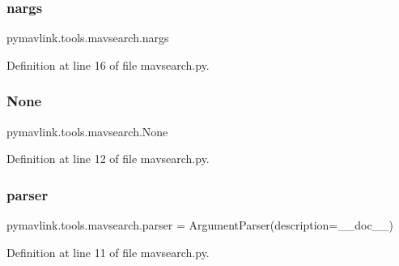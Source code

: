 \subsubsection{\texorpdfstring{nargs}{nargs}}
{\footnotesize\ttfamily pymavlink.\+tools.\+mavsearch.\+nargs}



Definition at line 16 of file mavsearch.\+py.

\mbox{\label{namespacepymavlink_1_1tools_1_1mavsearch_aa34c8e0d633cb457ef12fb58dc73fbd5}} 
\subsubsection{\texorpdfstring{None}{None}}
{\footnotesize\ttfamily pymavlink.\+tools.\+mavsearch.\+None}



Definition at line 12 of file mavsearch.\+py.

\mbox{\label{namespacepymavlink_1_1tools_1_1mavsearch_a1391d8703ddf1c8003e588947e33d99d}} 
\subsubsection{\texorpdfstring{parser}{parser}}
{\footnotesize\ttfamily pymavlink.\+tools.\+mavsearch.\+parser = Argument\+Parser(description=\+\_\+\+\_\+doc\+\_\+\+\_\+)}



Definition at line 11 of file mavsearch.\+py.

